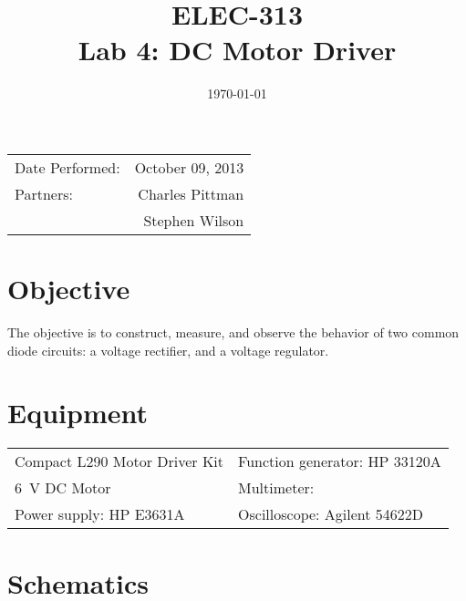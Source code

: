\documentclass{article}
\author{}
\title{ELEC-313 \\ Lab 4: DC Motor Driver\\ }
\date{\today}
\begin{document}
\maketitle

\begin{center}
  \begin{tabular}{lr}
    Date Performed: & October 09, 2013 \\
    Partners:       & Charles Pittman    \\
                    & Stephen Wilson     \\
  \end{tabular}
\end{center}

 \newpage


\renewcommand{\labelenumi}{\alph{enumi}.}

\section{Objective}
\label{sec:objective}

The objective is to construct, measure, and observe the behavior of two common diode circuits: a voltage rectifier, and a voltage regulator.

\section{Equipment}
\label{sec:equipment}

\begin{tabular}{ll}
  \centering
  Compact L290 Motor Driver Kit & Function generator: HP 33120A \\
  \SI{6}{V} DC Motor            & Multimeter:        \\
  Power supply: HP E3631A       & Oscilloscope: Agilent 54622D  \\
\end{tabular}

\section{Schematics}
\label{sec:schematics}

\end{document}

